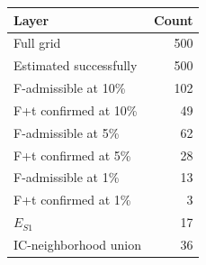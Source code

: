 \begin{tabular}{lr}
\toprule
Layer & Count \\
\midrule
Full grid & 500 \\
Estimated successfully & 500 \\
F-admissible at 10\% & 102 \\
F+t confirmed at 10\% & 49 \\
F-admissible at 5\% & 62 \\
F+t confirmed at 5\% & 28 \\
F-admissible at 1\% & 13 \\
F+t confirmed at 1\% & 3 \\
$E_{S1}$ & 17 \\
IC-neighborhood union & 36 \\
\bottomrule
\end{tabular}
